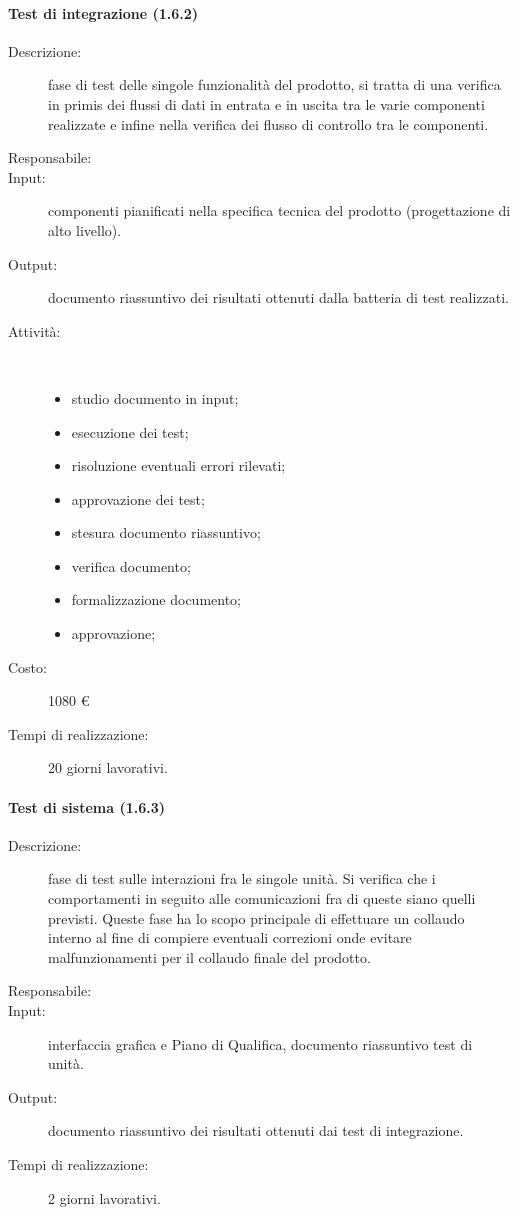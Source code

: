 \paragraph{Test di integrazione (1.6.2)}
\begin{description}
\item[Descrizione:] fase di test delle singole funzionalit\`{a} del prodotto, si tratta di una verifica in primis dei flussi di dati in entrata e in uscita tra le varie componenti realizzate e infine nella verifica dei flusso di controllo tra le componenti.
\item[Responsabile:] 
\item[Input:] componenti pianificati nella specifica tecnica del prodotto (progettazione di alto livello).
\item[Output:] documento riassuntivo dei risultati ottenuti dalla batteria di test realizzati.
\item[Attività:]\mbox{}\\[-1.5\baselineskip]
	\begin{itemize}
	\item studio documento in input;
	\item esecuzione dei test;
	\item risoluzione eventuali errori rilevati;
	\item approvazione dei test;
	\item stesura documento riassuntivo;
	\item verifica documento;
	\item formalizzazione documento;
	\item approvazione;
	\end{itemize}
\item[Costo:] 1080 \euro{}
\item[Tempi di realizzazione:] 20 giorni lavorativi.
\end{description}

\paragraph{Test di sistema (1.6.3)}  
\begin{description}
\item[Descrizione:] fase di test sulle interazioni fra le singole unit\`{a}. Si verifica che i comportamenti in seguito alle comunicazioni fra di queste siano quelli previsti. Queste fase ha lo scopo principale di effettuare un collaudo interno al fine di compiere eventuali correzioni onde evitare malfunzionamenti per il collaudo finale del prodotto.
\item[Responsabile:] 
\item[Input:] interfaccia grafica e Piano di Qualifica, documento riassuntivo test di unit\`{a}.
\item[Output:] documento riassuntivo dei risultati ottenuti dai test di integrazione.
\item[Tempi di realizzazione:] 2 giorni lavorativi.
\end{description}

